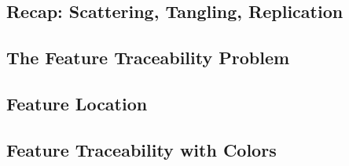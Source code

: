 \subsection{Recap: Scattering, Tangling, Replication}
\begin{frame}{\myframetitle}
	\begin{mycolumns}
		\todots
	\mynextcolumn
		\todots
	\end{mycolumns}
\end{frame}

\subsection{The Feature Traceability Problem}
\begin{frame}{\myframetitle}
	\begin{mycolumns}
		\todots
	\mynextcolumn
		\todots
	\end{mycolumns}
\end{frame}

\subsection{Feature Location}
\begin{frame}{\myframetitle}
	\begin{mycolumns}
		\todots
	\mynextcolumn
		\todots
	\end{mycolumns}
\end{frame}

\subsection{Feature Traceability with Colors}

